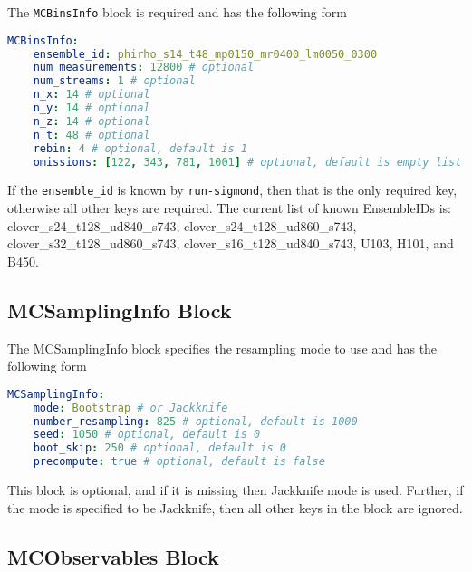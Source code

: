 \documentclass[12pt,letterpaper,notitlepage]{article}
\newcommand{\key}[1]{\textcolor{Emerald}{\texttt{\small{#1}}}}
\newcommand{\runsigmond}{\texttt{run-sigmond}}
\begin{document}
The \key{MCBinsInfo} block is required and has the following form
\begin{lstlisting}[language=yaml]
  MCBinsInfo:
    ensemble_id: phirho_s14_t48_mp0150_mr0400_lm0050_0300
    num_measurements: 12800 # optional
    num_streams: 1 # optional
    n_x: 14 # optional
    n_y: 14 # optional
    n_z: 14 # optional
    n_t: 48 # optional
    rebin: 4 # optional, default is 1
    omissions: [122, 343, 781, 1001] # optional, default is empty list
\end{lstlisting}
If the \key{ensemble\_id} is known by \runsigmond{}, then that is the only required key, otherwise all other keys are required.
The current list of known EnsembleIDs is:
clover\_s24\_t128\_ud840\_s743, clover\_s24\_t128\_ud860\_s743, clover\_s32\_t128\_ud860\_s743, clover\_s16\_t128\_ud840\_s743, U103, H101, and B450.

\subsection{MCSamplingInfo Block}

The MCSamplingInfo block specifies the resampling mode to use and has the following form
\begin{lstlisting}[language=yaml]
  MCSamplingInfo:
    mode: Bootstrap # or Jackknife
    number_resampling: 825 # optional, default is 1000
    seed: 1050 # optional, default is 0
    boot_skip: 250 # optional, default is 0
    precompute: true # optional, default is false
\end{lstlisting}
This block is optional, and if it is missing then Jackknife mode is used.
Further, if the mode is specified to be Jackknife, then all other keys in the block are ignored.

\subsection{MCObservables Block}
\end{document}
